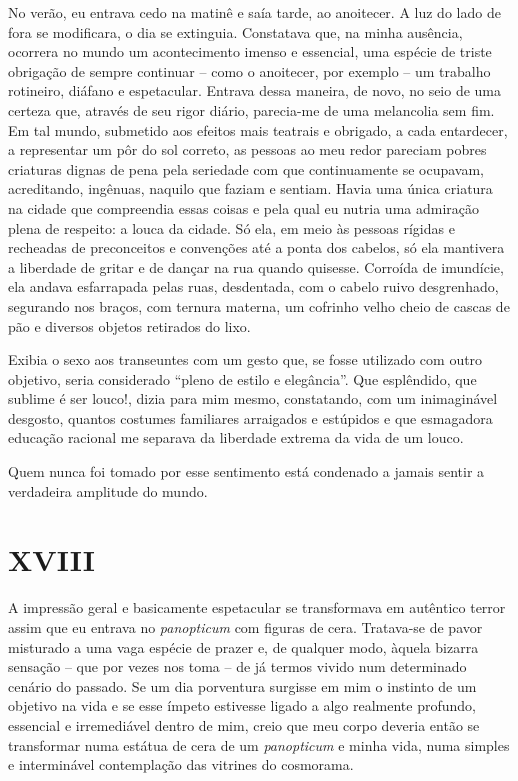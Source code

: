No verão, eu entrava cedo na matinê e saía tarde, ao anoitecer. A luz do lado de fora se modificara, o dia se extinguia. Constatava que, na minha ausência, ocorrera no mundo um acontecimento imenso e essencial, uma espécie de triste obrigação de sempre continuar -- como o anoitecer, por exemplo -- um trabalho rotineiro, diáfano e espetacular. Entrava dessa maneira, de novo, no seio de uma certeza que, através de seu rigor diário, parecia-me de uma melancolia sem fim. Em tal mundo, submetido aos efeitos mais teatrais e obrigado, a cada entardecer, a representar um pôr do sol correto, as pessoas ao meu redor pareciam pobres criaturas dignas de pena pela seriedade com que continuamente se ocupavam, acreditando, ingênuas, naquilo que faziam e sentiam. Havia uma única criatura na cidade que compreendia essas coisas e pela qual eu nutria uma admiração plena de respeito: a louca da cidade. Só ela, em meio às pessoas rígidas e recheadas de preconceitos e convenções até a ponta dos cabelos, só ela mantivera a liberdade de gritar e de dançar na rua quando quisesse. Corroída de imundície, ela andava esfarrapada pelas ruas, desdentada, com o cabelo ruivo desgrenhado, segurando nos braços, com ternura materna, um cofrinho velho cheio de cascas de pão e diversos objetos retirados do lixo.

Exibia o sexo aos transeuntes com um gesto que, se fosse utilizado com outro objetivo, seria considerado ``pleno de estilo e elegância''. Que esplêndido, que sublime é ser louco!, dizia para mim mesmo, constatando, com um inimaginável desgosto, quantos costumes familiares arraigados e estúpidos e que esmagadora educação racional me separava da liberdade extrema da vida de um louco.

Quem nunca foi tomado por esse sentimento está condenado a jamais sentir a verdadeira amplitude do mundo.


\chapter*{\centering\Large{XVIII}}

A impressão geral e basicamente espetacular se transformava em autêntico terror assim que eu entrava no \textit{panopticum} com figuras de cera.  Tratava-se de pavor misturado a uma vaga espécie de prazer e, de qualquer modo, àquela bizarra sensação -- que por vezes nos toma -- de já termos vivido num determinado cenário do passado. Se um dia porventura surgisse em mim o instinto de um objetivo na vida e se esse ímpeto estivesse ligado a algo realmente profundo, essencial e irremediável dentro de mim, creio que meu corpo deveria então se transformar numa estátua de cera de um \textit{panopticum} e minha vida, numa simples e interminável contemplação das vitrines do cosmorama.

